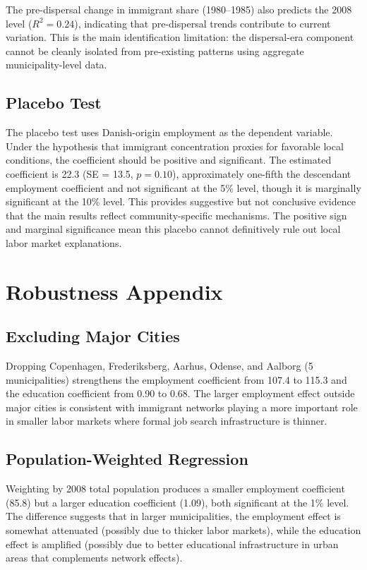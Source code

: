 \documentclass[12pt]{article}
\begin{document}
The pre-dispersal change in immigrant share (1980--1985) also predicts the 2008 level ($R^2 = 0.24$), indicating that pre-dispersal trends contribute to current variation. This is the main identification limitation: the dispersal-era component cannot be cleanly isolated from pre-existing patterns using aggregate municipality-level data.

\subsection{Placebo Test}

The placebo test uses Danish-origin employment as the dependent variable. Under the hypothesis that immigrant concentration proxies for favorable local conditions, the coefficient should be positive and significant. The estimated coefficient is 22.3 (SE = 13.5, $p = 0.10$), approximately one-fifth the descendant employment coefficient and not significant at the 5\% level, though it is marginally significant at the 10\% level. This provides suggestive but not conclusive evidence that the main results reflect community-specific mechanisms. The positive sign and marginal significance mean this placebo cannot definitively rule out local labor market explanations.

\section{Robustness Appendix}

\subsection{Excluding Major Cities}

Dropping Copenhagen, Frederiksberg, Aarhus, Odense, and Aalborg (5 municipalities) strengthens the employment coefficient from 107.4 to 115.3 and the education coefficient from 0.90 to 0.68. The larger employment effect outside major cities is consistent with immigrant networks playing a more important role in smaller labor markets where formal job search infrastructure is thinner.

\subsection{Population-Weighted Regression}

Weighting by 2008 total population produces a smaller employment coefficient (85.8) but a larger education coefficient (1.09), both significant at the 1\% level. The difference suggests that in larger municipalities, the employment effect is somewhat attenuated (possibly due to thicker labor markets), while the education effect is amplified (possibly due to better educational infrastructure in urban areas that complements network effects).
\end{document}
